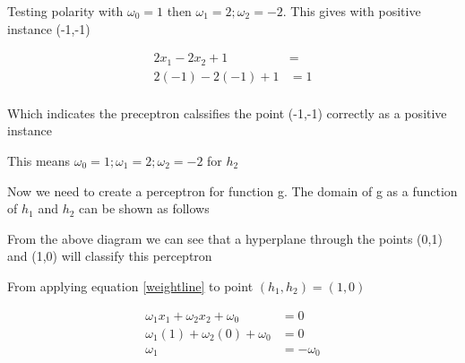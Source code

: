\documentclass[10pt,a4paper]{article}
\begin{document}
Testing polarity with $\omega_0 = 1$ then $\omega_1=2;\omega_2=-2$. This gives with positive instance (-1,-1)

\begin{equation}
\begin{split}
2x_1 - 2x_2 +1 &= \\
2(-1) - 2(-1) +1 &= 1 \\
\end{split}
\end{equation}  

Which indicates the preceptron calssifies the point (-1,-1) correctly as a positive instance

This means $\omega_0 = 1;\omega_1=2;\omega_2=-2$ for $h_2$


Now we need to create a perceptron for function g. The domain of g as a function of $h_1$ and $h_2$ can be shown as follows

\begin{center}
\end{center}

From the above diagram we can see that a hyperplane through the points (0,1) and (1,0) will classify this perceptron

From applying equation \ref{weightline} to point $(h_1,h_2) = (1,0)$

\begin{equation}
\label{2bc1}
\begin{split}
\omega_1 x_1 + \omega_2 x_2 + \omega_0 &= 0 \\
\omega_1(1) + \omega_2(0) + \omega_0 &= 0 \\
\omega_1 &= -\omega_0\\
\end{split}
\end{equation}
\end{document}
